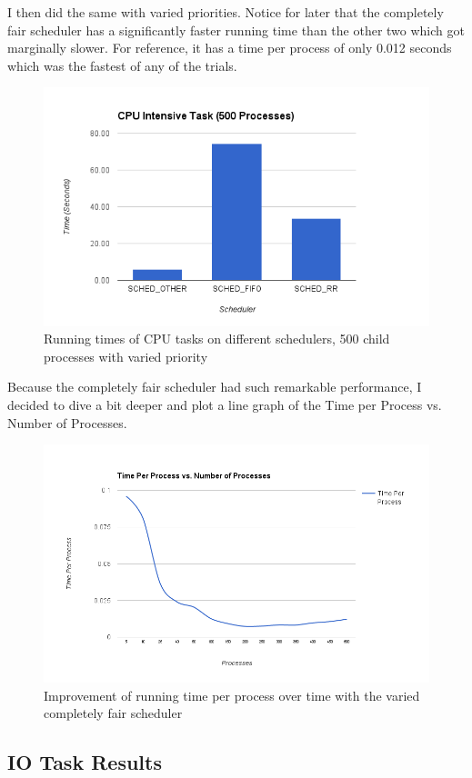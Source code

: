 \documentclass{article}
\begin{document}
I then did the same with varied priorities. Notice for later that the completely fair scheduler has a significantly faster running time than the other two which got marginally slower. For reference, it has a time per process of only 0.012 seconds which was the fastest of any of the trials.

\begin{figure}[H]
  \centering
  \includegraphics[width=0.8\linewidth]{CPUVaried.png}
  \caption{Running times of CPU tasks on different schedulers, 500 child processes with varied priority}
\end{figure}

 Because the completely fair scheduler had such remarkable performance, I decided to dive a bit deeper and plot a line graph of the Time per Process vs. Number of Processes.

\begin{figure}[H]
  \centering
  \includegraphics[width=0.8\linewidth]{CPUProcessesGraph.png}
  \caption{Improvement of running time per process over time with the varied completely fair scheduler}
\end{figure}


\subsection{IO Task Results}
\end{document}
